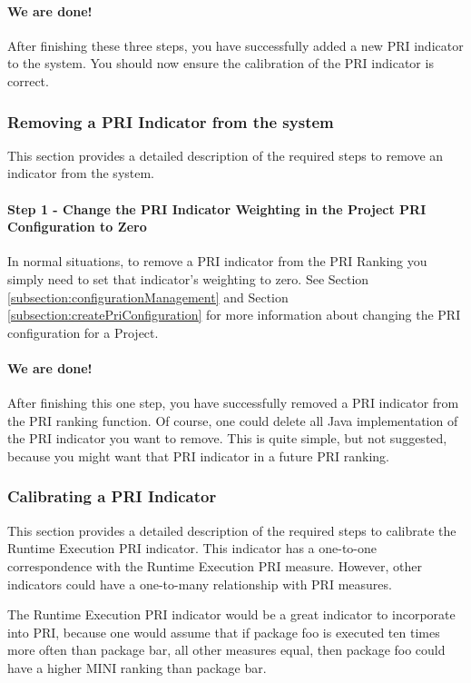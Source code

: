 \paragraph{We are done!} 
After finishing these three steps, you have successfully added a new PRI
indicator to the system. You should now ensure the calibration of the PRI
indicator is correct. 

\subsubsection{Removing a PRI Indicator from the system}
This section provides a detailed description of the required steps to
remove an indicator from the system. 

\paragraph{Step 1 - Change the PRI Indicator Weighting in the Project PRI
  Configuration to Zero}
In normal situations, to remove a PRI indicator from the PRI Ranking you
simply need to set that indicator's weighting to zero. See Section
\ref{subsection:configurationManagement} and Section
\ref{subsection:createPriConfiguration} for more information about changing 
the PRI configuration for a Project. 

\paragraph{We are done!} 
After finishing this one step, you have successfully removed a PRI
indicator from the PRI ranking function. Of course, one could delete all
Java implementation of the PRI indicator you want to remove. This is quite
simple, but not suggested, because you might want that PRI indicator in a
future PRI ranking. 


\subsubsection{Calibrating a PRI Indicator}
\label{subsubsection:calibratePriIndicator}
This section provides a detailed description of the required steps to
calibrate the Runtime Execution PRI indicator. This indicator has a
one-to-one correspondence with the Runtime Execution PRI measure. However,
other indicators could have a one-to-many relationship with PRI measures.

The Runtime Execution PRI indicator would be a great indicator to
incorporate into PRI, because one would assume that if package foo is
executed ten times more often than package bar, all other measures equal,
then package foo could have a higher MINI ranking than package bar.

